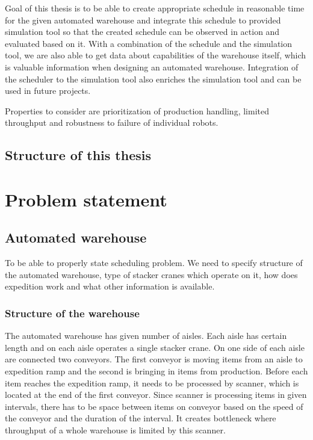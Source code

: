 \documentclass{ctuthesis}
\begin{document}
Goal of this thesis is to be able to create appropriate schedule in reasonable time for the given automated warehouse and integrate this schedule to provided simulation tool so that the created schedule can be observed in action and evaluated based on it. With a combination of the schedule and the simulation tool, we are also able to get data about capabilities of the warehouse itself, which is valuable information when designing an automated warehouse. Integration of the scheduler to the simulation tool also enriches the simulation tool and can be used in future projects.

Properties to consider are prioritization of production handling, limited throughput and robustness to failure of individual robots. 

\section{Structure of this thesis}



\chapter{Problem statement}
\section{Automated warehouse}
To be able to properly state scheduling problem. We need to specify structure of the automated warehouse, type of stacker cranes which operate on it, how does expedition work and what other information is available.

\subsection{Structure of the warehouse}

The automated warehouse has given number of aisles. Each aisle has certain length and on each aisle operates a single stacker crane. On one side of each aisle are connected two conveyors. The first conveyor is moving items from an aisle to expedition ramp and the second is bringing in items from production. Before each item reaches the expedition ramp, it needs to be processed by scanner, which is located at the end of the first conveyor. Since scanner is processing items in given intervals, there has to be space between items on conveyor based on the speed of the conveyor and the duration of the interval. It creates bottleneck where throughput of a whole warehouse is limited by this scanner.
\end{document}
